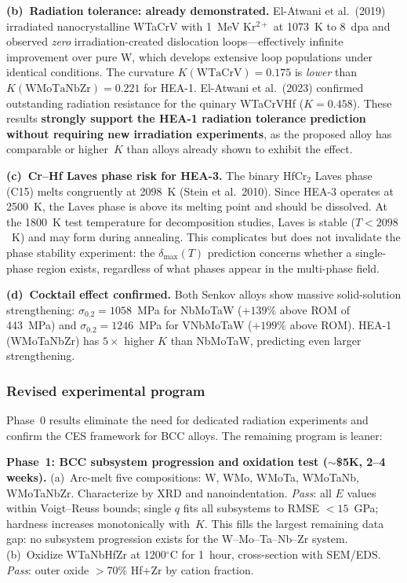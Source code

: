 \documentclass[12pt,letterpaper]{article}
\theoremstyle{definition}
\begin{document}
\textbf{(b)~Radiation tolerance: already demonstrated.}  El-Atwani et al.\ (2019) irradiated nanocrystalline WTaCrV with 1~MeV Kr$^{2+}$ at 1073~K to 8~dpa and observed \emph{zero} irradiation-created dislocation loops---effectively infinite improvement over pure W, which develops extensive loop populations under identical conditions.  The curvature $K(\text{WTaCrV}) = 0.175$ is \emph{lower} than $K(\text{WMoTaNbZr}) = 0.221$ for HEA-1.  El-Atwani et al.\ (2023) confirmed outstanding radiation resistance for the quinary WTaCrVHf ($K = 0.458$).  These results \textbf{strongly support the HEA-1 radiation tolerance prediction without requiring new irradiation experiments}, as the proposed alloy has comparable or higher~$K$ than alloys already shown to exhibit the effect.

\textbf{(c)~Cr--Hf Laves phase risk for HEA-3.}  The binary HfCr$_2$ Laves phase (C15) melts congruently at 2098~K (Stein et al.\ 2010).  Since HEA-3 operates at 2500~K, the Laves phase is above its melting point and should be dissolved.  At the 1800~K test temperature for decomposition studies, Laves is stable ($T < 2098$~K) and may form during annealing.  This complicates but does not invalidate the phase stability experiment: the $\delta_{\max}(T)$ prediction concerns whether a single-phase region exists, regardless of what phases appear in the multi-phase field.

\textbf{(d)~Cocktail effect confirmed.}  Both Senkov alloys show massive solid-solution strengthening: $\sigma_{0.2} = 1058$~MPa for NbMoTaW ($+139\%$ above ROM of 443~MPa) and $\sigma_{0.2} = 1246$~MPa for VNbMoTaW ($+199\%$ above ROM).  HEA-1 (WMoTaNbZr) has $5\times$ higher $K$ than NbMoTaW, predicting even larger strengthening.

\subsubsection{Revised experimental program}

Phase~0 results eliminate the need for dedicated radiation experiments and confirm the CES framework for BCC alloys.  The remaining program is leaner:

\textbf{Phase~1: BCC subsystem progression and oxidation test ($\sim$\$5K, 2--4 weeks).}  (a)~Arc-melt five compositions: W, WMo, WMoTa, WMoTaNb, WMoTaNbZr.  Characterize by XRD and nanoindentation.  \emph{Pass}: all $E$ values within Voigt--Reuss bounds; single $q$ fits all subsystems to RMSE $< 15$~GPa; hardness increases monotonically with~$K$.  This fills the largest remaining data gap: no subsystem progression exists for the W--Mo--Ta--Nb--Zr system.  (b)~Oxidize WTaNbHfZr at 1200$^\circ$C for 1~hour, cross-section with SEM/EDS\@.  \emph{Pass}: outer oxide $>$70\% Hf$+$Zr by cation fraction.
\end{document}
